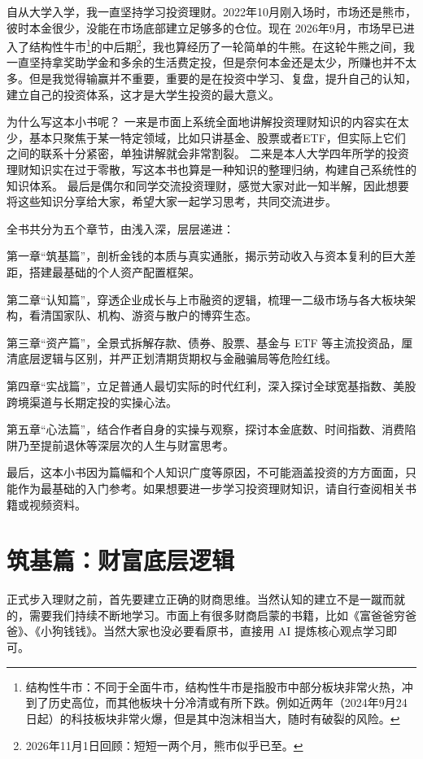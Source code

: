 \documentclass[12pt,openany]{book}
\makeatletter
\renewcommand\mainmatter{%
  \clearpage
  \@mainmattertrue
  \pagenumbering{arabic}%
}
\makeatother
\begin{document}
自从大学入学，我一直坚持学习投资理财。2022年10月刚入场时，市场还是熊市，彼时本金很少，没能在市场底部建立足够多的仓位。现在 2026年9月，市场早已进入了结构性牛市\footnote{结构性牛市：不同于全面牛市，结构性牛市是指股市中部分板块非常火热，冲到了历史高位，而其他板块十分冷清或有所下跌。例如近两年（2024年9月24日起）的科技板块非常火爆，但是其中泡沫相当大，随时有破裂的风险。}的中后期\footnote{2026年11月1日回顾：短短一两个月，熊市似乎已至。}，我也算经历了一轮简单的牛熊。在这轮牛熊之间，我一直坚持拿奖助学金和多余的生活费定投，但是奈何本金还是太少，所赚也并不太多。但是我觉得输赢并不重要，重要的是在投资中学习、复盘，提升自己的认知，建立自己的投资体系，这才是大学生投资的最大意义。

为什么写这本小书呢？
一来是市面上系统全面地讲解投资理财知识的内容实在太少，基本只聚焦于某一特定领域，比如只讲基金、股票或者ETF，但实际上它们之间的联系十分紧密，单独讲解就会非常割裂。
二来是本人大学四年所学的投资理财知识实在过于零散，写这本书也算是一种知识的整理归纳，构建自己系统性的知识体系。
最后是偶尔和同学交流投资理财，感觉大家对此一知半解，因此想要将这些知识分享给大家，希望大家一起学习思考，共同交流进步。

全书共分为五个章节，由浅入深，层层递进：

第一章“筑基篇”，剖析金钱的本质与真实通胀，揭示劳动收入与资本复利的巨大差距，搭建最基础的个人资产配置框架。

第二章“认知篇”，穿透企业成长与上市融资的逻辑，梳理一二级市场与各大板块架构，看清国家队、机构、游资与散户的博弈生态。

第三章“资产篇”，全景式拆解存款、债券、股票、基金与 ETF 等主流投资品，厘清底层逻辑与区别，并严正划清期货期权与金融骗局等危险红线。

第四章“实战篇”，立足普通人最切实际的时代红利，深入探讨全球宽基指数、美股跨境渠道与长期定投的实操心法。

第五章“心法篇”，结合作者自身的实操与观察，探讨本金底数、时间指数、消费陷阱乃至提前退休等深层次的人生与财富思考。

最后，这本小书因为篇幅和个人知识广度等原因，不可能涵盖投资的方方面面，只能作为最基础的入门参考。如果想要进一步学习投资理财知识，请自行查阅相关书籍或视频资料。

\mainmatter
{}
\setcounter{page}{1}

\chapter{筑基篇：财富底层逻辑}

正式步入理财之前，首先要建立正确的财商思维。当然认知的建立不是一蹴而就的，需要我们持续不断地学习。市面上有很多财商启蒙的书籍，比如《富爸爸穷爸爸》、《小狗钱钱》。当然大家也没必要看原书，直接用 AI 提炼核心观点学习即可。
\end{document}
